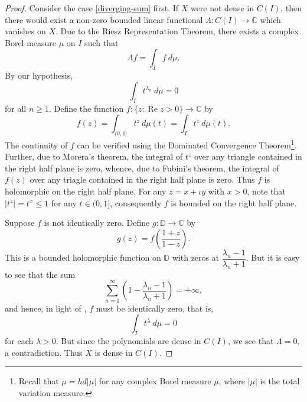 \documentclass[11pt]{article}
\theoremstyle{thmstyle}
\theoremstyle{defstyle}
\newcommand{\bbC}{\mathbb{C}}
\newcommand{\bbD}{\mathbb{D}} %
\renewcommand{\le}{\leqslant}
\renewcommand{\ge}{\geqslant}
\renewcommand{\Re}{\operatorname{Re}}
\begin{document}
\begin{proof}
    Consider the case \ref{diverging-sum} first. If $X$ were not dense in $C(I)$, then there would exist a non-zero bounded linear functional $\Lambda\colon C(I)\to\bbC$ which vanishes on $X$. Due to the Riesz Representation Theorem, there exists a complex Borel measure $\mu$ on $I$ such that 
    \begin{equation*}
        \Lambda f = \int_I f~d\mu.
    \end{equation*}
    By our hypothesis, 
    \begin{equation*}
        \int_I t^{\lambda_n}~d\mu = 0
    \end{equation*}
    for all $n\ge 1$. Define the function $f\colon\{z\colon\Re z > 0\}\to \bbC$ by 
    \begin{equation*}
        f(z) = \int_{(0, 1]} t^z~d\mu(t) = \int_I t^z~d\mu(t).
    \end{equation*}
    The continuity of $f$ can be verified using the Dominated Convergence Theorem\footnote{Recall that $\mu = hd|\mu|$ for any complex Borel measure $\mu$, where $|\mu|$ is the total variation measure.}. Further, due to Morera's theorem, the integral of $t^z$ over any triangle contained in the right half plane is zero, whence, due to Fubini's theorem, the integral of $f(z)$ over any triagle contained in the right half plane is zero. Thus $f$ is holomorphic on the right half plane. For any $z = x + \iota y$ with $x > 0$, note that $|t^z| = t^x\le 1$ for any $t\in (0, 1]$, consequently $f$ is bounded on the right half plane. 

    Suppose $f$ is not identically zero. Define $g\colon\bbD\to\bbC$ by 
    \begin{equation*}
        g(z) = f\left(\frac{1 + z}{1 - z}\right).
    \end{equation*}
    This is a bounded holomorphic function on $\bbD$ with zeros at $\dfrac{\lambda_n - 1}{\lambda_n + 1}$. But it is easy to see that the sum
    \begin{equation*}
        \sum_{n = 1}^\infty\left(1 - \frac{\lambda_n - 1}{\lambda_n + 1}\right) = +\infty,
    \end{equation*}
    and hence, in light of , $f$ must be identically zero, that is, 
    \begin{equation*}
        \int_{I} t^\lambda~d\mu = 0
    \end{equation*}
    for each $\lambda > 0$. But since the polynomials are dense in $C(I)$, we see that $\Lambda = 0$, a contradiction. Thus $X$ is dense in $C(I)$.  %
\end{proof}
\end{document}
